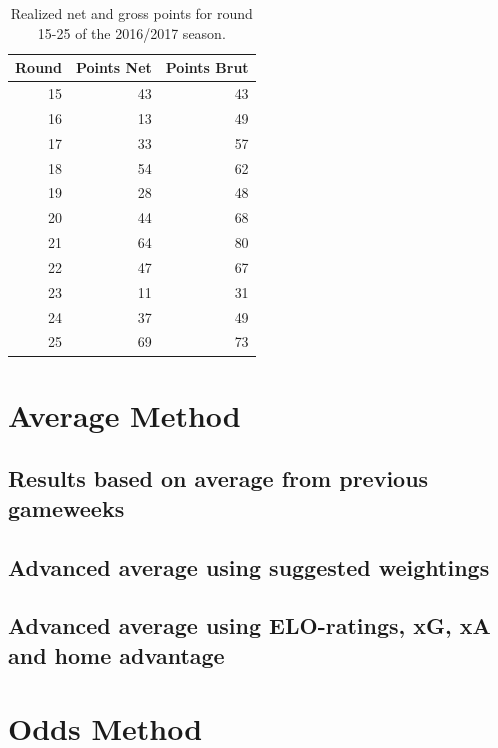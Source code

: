 \begin{table}[]
\centering
\caption{Realized net and gross points for round 15-25 of the 2016/2017 season.}
\label{tab:results_reg_16/17}
\begin{tabular}{@{}rrr@{}}
\toprule
Round & Points Net & Points Brut \\ 
\midrule
15    & 43     & 43             \\
16    & 13     & 49             \\
17    & 33     & 57             \\
18    & 54     & 62             \\
19    & 28     & 48             \\
20    & 44     & 68             \\
21    & 64     & 80             \\
22    & 47     & 67             \\
23    & 11     & 31             \\
24    & 37     & 49             \\
25    & 69     & 73             \\ 
\end{tabular}
\end{table}


\section{Average Method}
\subsection{Results based on average from previous gameweeks}
\subsection{Advanced average using suggested weightings}
\subsection{Advanced average using ELO-ratings, xG, xA and home advantage}
\section{Odds Method}

